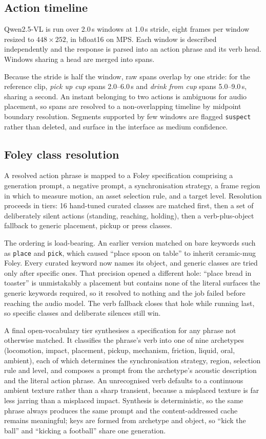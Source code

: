 \documentclass[conference]{IEEEtran}
\begin{document}
\subsection{Action timeline}

Qwen2.5-VL is run over 2.0\,s windows at 1.0\,s stride, eight frames per window
resized to $448\times252$, in bfloat16 on MPS. Each window is described
independently and the response is parsed into an action phrase and its verb head.
Windows sharing a head are merged into spans.

Because the stride is half the window, raw spans overlap by one stride: for the
reference clip, \emph{pick up cup} spans 2.0--6.0\,s and \emph{drink from cup}
spans 5.0--9.0\,s, sharing a second. An instant belonging to two actions is
ambiguous for audio placement, so spans are resolved to a non-overlapping timeline
by midpoint boundary resolution. Segments supported by few windows are flagged
\texttt{suspect} rather than deleted, and surface in the interface as medium
confidence.

\subsection{Foley class resolution}

A resolved action phrase is mapped to a Foley specification comprising a
generation prompt, a negative prompt, a synchronisation strategy, a frame region
in which to measure motion, an asset selection rule, and a target level.
Resolution proceeds in tiers: 16 hand-tuned curated classes are matched first,
then a set of deliberately silent actions (standing, reaching, holding), then a
verb-plus-object fallback to generic placement, pickup or press classes.

The ordering is load-bearing. An earlier version matched on bare keywords such as
\texttt{place} and \texttt{pick}, which caused ``place spoon on table'' to inherit
ceramic-mug Foley. Every curated keyword now names its object, and generic classes
are tried only after specific ones. That precision opened a different hole:
``place bread in toaster'' is unmistakably a placement but contains none of the
literal surfaces the generic keywords required, so it resolved to nothing and the
job failed before reaching the audio model. The verb fallback closes that hole
while running last, so specific classes and deliberate silences still win.

A final open-vocabulary tier synthesises a specification for any phrase not
otherwise matched. It classifies the phrase's verb into one of nine archetypes
(locomotion, impact, placement, pickup, mechanism, friction, liquid, oral,
ambient), each of which determines the synchronisation strategy, region, selection
rule and level, and composes a prompt from the archetype's acoustic description
and the literal action phrase. An unrecognised verb defaults to a continuous
ambient texture rather than a sharp transient, because a misplaced texture is far
less jarring than a misplaced impact. Synthesis is deterministic, so the same
phrase always produces the same prompt and the content-addressed cache remains
meaningful; keys are formed from archetype and object, so ``kick the ball'' and
``kicking a football'' share one generation.
\end{document}
